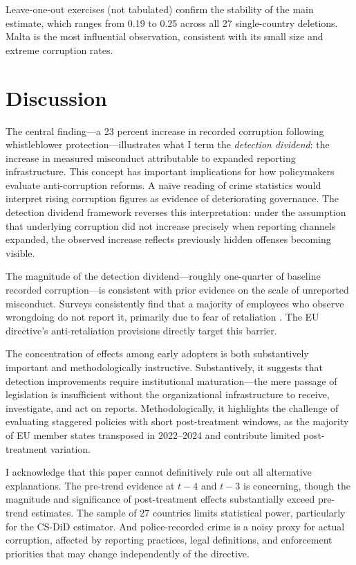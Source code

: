 \documentclass[12pt]{article}
\begin{document}
Leave-one-out exercises (not tabulated) confirm the stability of the main estimate, which ranges from 0.19 to 0.25 across all 27 single-country deletions. Malta is the most influential observation, consistent with its small size and extreme corruption rates.

\section{Discussion}

The central finding---a 23 percent increase in recorded corruption following whistleblower protection---illustrates what I term the \textit{detection dividend}: the increase in measured misconduct attributable to expanded reporting infrastructure. This concept has important implications for how policymakers evaluate anti-corruption reforms. A na\"ive reading of crime statistics would interpret rising corruption figures as evidence of deteriorating governance. The detection dividend framework reverses this interpretation: under the assumption that underlying corruption did not increase precisely when reporting channels expanded, the observed increase reflects previously hidden offenses becoming visible.

The magnitude of the detection dividend---roughly one-quarter of baseline recorded corruption---is consistent with prior evidence on the scale of unreported misconduct. Surveys consistently find that a majority of employees who observe wrongdoing do not report it, primarily due to fear of retaliation \citep{ethics_resource_center_2014, miceli_near_dworkin_2008}. The EU directive's anti-retaliation provisions directly target this barrier.

The concentration of effects among early adopters is both substantively important and methodologically instructive. Substantively, it suggests that detection improvements require institutional maturation---the mere passage of legislation is insufficient without the organizational infrastructure to receive, investigate, and act on reports. Methodologically, it highlights the challenge of evaluating staggered policies with short post-treatment windows, as the majority of EU member states transposed in 2022--2024 and contribute limited post-treatment variation.

I acknowledge that this paper cannot definitively rule out all alternative explanations. The pre-trend evidence at $t - 4$ and $t - 3$ is concerning, though the magnitude and significance of post-treatment effects substantially exceed pre-trend estimates. The sample of 27 countries limits statistical power, particularly for the CS-DiD estimator. And police-recorded crime is a noisy proxy for actual corruption, affected by reporting practices, legal definitions, and enforcement priorities that may change independently of the directive.
\end{document}
